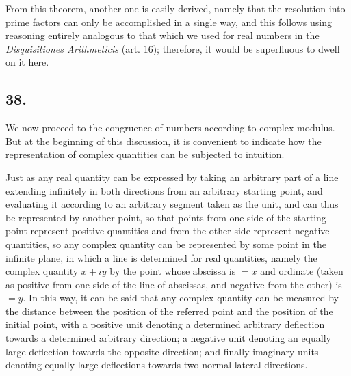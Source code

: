 \documentclass[twoside,12pt, showframe]{memoir}
\begin{document}
From this theorem, another one is easily derived, namely that the resolution into prime factors can only be accomplished in a single way, and this follows using reasoning entirely analogous to that which we used for real numbers in the \textit{Disquisitiones Arithmeticis} (art. 16); therefore, it would be superfluous to dwell on it here.
%

\subsection*{38.}

We now proceed to the congruence of numbers according to complex modulus. But at the beginning of this discussion, it is convenient to indicate how the representation of complex quantities can be subjected to intuition.

Just as any real quantity can be expressed by taking an arbitrary part of a line extending infinitely in both directions from an arbitrary starting point, and evaluating it according to an arbitrary segment taken as the unit, and can thus be represented by another point, so that points from one side of the starting point represent positive quantities and from the other side represent negative quantities, so any complex quantity can be represented by some point in the infinite plane, in which a line is determined for real quantities, namely the complex quantity \(x+i y\) by the point whose abscissa is \(=x\) and ordinate (taken as positive from one side of the line of abscissas, and negative from the other) is \(=y\). In this way, it can be said that any complex quantity can be measured by the distance between the position of the referred point and the position of the initial point, with a positive unit denoting a determined arbitrary deflection towards a determined arbitrary direction; a negative unit denoting an equally large deflection towards the opposite direction; and finally imaginary units denoting equally large deflections towards two normal lateral directions.
%
\end{document}
